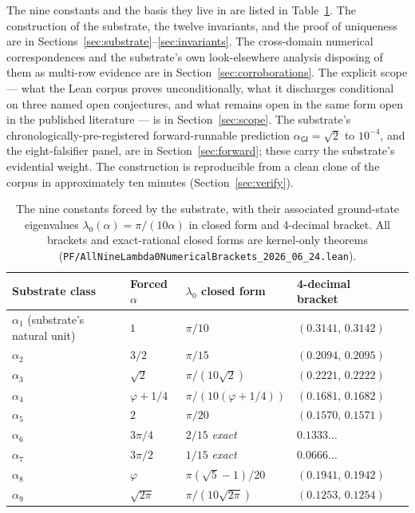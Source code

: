 \documentclass[11pt,a4paper]{amsart}
\theoremstyle{plain}
\theoremstyle{definition}
\begin{document}
The nine constants and the basis they live in are listed in Table~\ref{tab:nine}. The construction of the substrate, the twelve invariants, and the proof of uniqueness are in Sections~\ref{sec:substrate}--\ref{sec:invariants}. The cross-domain numerical correspondences and the substrate's own look-elsewhere analysis disposing of them as multi-row evidence are in Section~\ref{sec:corroborations}. The explicit scope --- what the Lean corpus proves unconditionally, what it discharges conditional on three named open conjectures, and what remains open in the same form open in the published literature --- is in Section~\ref{sec:scope}. The substrate's chronologically-pre-registered forward-runnable prediction $\alpha_{\textsf{GI}} = \sqrt{2}$ to $10^{-4}$, and the eight-falsifier panel, are in Section~\ref{sec:forward}; these carry the substrate's evidential weight. The construction is reproducible from a clean clone of the corpus in approximately ten minutes (Section~\ref{sec:verify}).

\begin{table}[h]
\centering
\caption{The nine constants forced by the substrate, with their associated ground-state eigenvalues $\lambda_0(\alpha) = \pi/(10\alpha)$ in closed form and 4-decimal bracket. All brackets and exact-rational closed forms are kernel-only theorems (\texttt{PF/AllNineLambda0NumericalBrackets\_2026\_06\_24.lean}).}\label{tab:nine}
\begin{tabular}{lllll}
\toprule
Substrate class & Forced $\alpha$ & $\lambda_0$ closed form & 4-decimal bracket \\
\midrule
$\alpha_1$ (substrate's natural unit) & $1$            & $\pi/10$                 & $(0.3141,\,0.3142)$ \\
$\alpha_2$                            & $3/2$          & $\pi/15$                 & $(0.2094,\,0.2095)$ \\
$\alpha_3$                            & $\sqrt{2}$     & $\pi/(10\sqrt{2})$       & $(0.2221,\,0.2222)$ \\
$\alpha_4$                            & $\varphi+1/4$  & $\pi/(10(\varphi+1/4))$  & $(0.1681,\,0.1682)$ \\
$\alpha_5$                            & $2$            & $\pi/20$                 & $(0.1570,\,0.1571)$ \\
$\alpha_6$                            & $3\pi/4$       & $2/15$ \textit{exact}    & $0.1333\ldots$       \\
$\alpha_7$                            & $3\pi/2$       & $1/15$ \textit{exact}    & $0.0666\ldots$       \\
$\alpha_8$                            & $\varphi$      & $\pi(\sqrt{5}-1)/20$     & $(0.1941,\,0.1942)$ \\
$\alpha_9$                            & $\sqrt{2\pi}$  & $\pi/(10\sqrt{2\pi})$    & $(0.1253,\,0.1254)$ \\
\bottomrule
\end{tabular}
\end{table}
\end{document}
